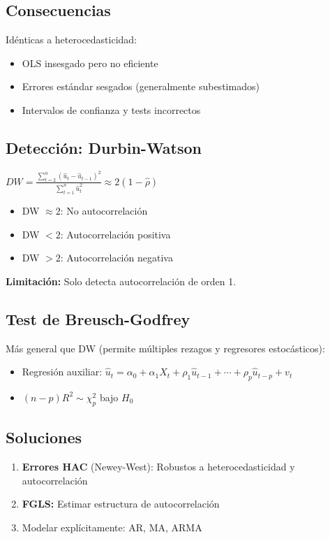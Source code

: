 \documentclass[9pt, spanish, twoside]{article}
\newcommand{\critical}[1]{\textcolor{CriticalRed}{\textbf{#1}}}
\newcommand{\eqbox}[1]{\colorbox{TitaniumGray}{$\displaystyle #1$}}
\begin{document}
\begin{multicols*}{3}
\subsection{Consecuencias}
Idénticas a heterocedasticidad:
\begin{itemize}[leftmargin=8pt, noitemsep, topsep=2pt]
    \item OLS insesgado pero no eficiente
    \item Errores estándar sesgados (generalmente subestimados)
    \item Intervalos de confianza y tests incorrectos
\end{itemize}

\subsection{Detección: Durbin-Watson}
\eqbox{DW = \frac{\sum_{t=2}^n(\hat{u}_t - \hat{u}_{t-1})^2}{\sum_{t=1}^n\hat{u}_t^2} \approx 2(1 - \hat{\rho})}

\begin{itemize}[leftmargin=8pt, noitemsep, topsep=2pt]
    \item DW $\approx 2$: No autocorrelación
    \item DW $< 2$: Autocorrelación positiva
    \item DW $> 2$: Autocorrelación negativa
\end{itemize}

\critical{Limitación:} Solo detecta autocorrelación de orden 1.

\subsection{Test de Breusch-Godfrey}
Más general que DW (permite múltiples rezagos y regresores estocásticos):
\begin{itemize}[leftmargin=8pt, noitemsep, topsep=2pt]
    \item Regresión auxiliar: $\hat{u}_t = \alpha_0 + \alpha_1 X_t + \rho_1 \hat{u}_{t-1} + \cdots + \rho_p \hat{u}_{t-p} + v_t$
    \item $(n-p)R^2 \sim \chi^2_p$ bajo $H_0$
\end{itemize}

\subsection{Soluciones}
\begin{enumerate}[leftmargin=8pt, noitemsep, topsep=2pt]
    \item \critical{Errores HAC} (Newey-West): Robustos a heterocedasticidad y autocorrelación
    \item \textbf{FGLS:} Estimar estructura de autocorrelación
    \item Modelar explícitamente: AR, MA, ARMA
\end{enumerate}


\end{multicols*}
\end{document}
